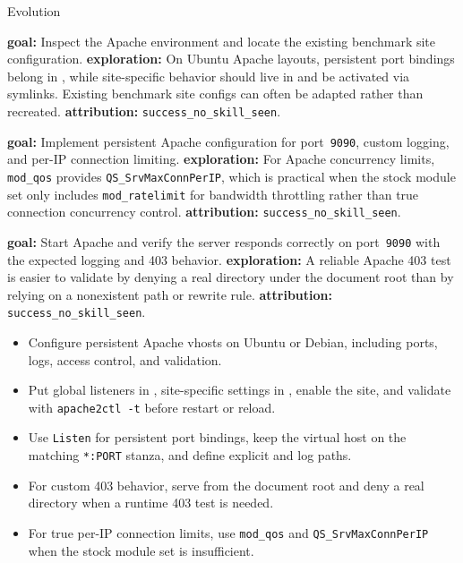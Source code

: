 \begin{svpromptbox}{Evolution}
\svpartsep
{}
\begin{enumerate}[label=\textnormal{[\arabic*]}, leftmargin=*]
    \item \textbf{goal:} Inspect the Apache environment and locate the existing benchmark site configuration. \textbf{exploration:} On Ubuntu Apache layouts, persistent port bindings belong in , while site-specific behavior should live in  and be activated via symlinks. Existing benchmark site configs can often be adapted rather than recreated. \textbf{attribution:} \texttt{success\_no\_skill\_seen}.
    \item \textbf{goal:} Implement persistent Apache configuration for port~\texttt{9090}, custom logging, and per-IP connection limiting. \textbf{exploration:} For Apache concurrency limits, \texttt{mod\_qos} provides \texttt{QS\_SrvMaxConnPerIP}, which is practical when the stock module set only includes \texttt{mod\_ratelimit} for bandwidth throttling rather than true connection concurrency control. \textbf{attribution:} \texttt{success\_no\_skill\_seen}.
    \item \textbf{goal:} Start Apache and verify the server responds correctly on port~\texttt{9090} with the expected logging and 403 behavior. \textbf{exploration:} A reliable Apache 403 test is easier to validate by denying a real directory under the document root than by relying on a nonexistent path or rewrite rule. \textbf{attribution:} \texttt{success\_no\_skill\_seen}.
\end{enumerate}

\svpartsep
{}
\begin{itemize}
    \item Configure persistent Apache vhosts on Ubuntu or Debian, including ports, logs, access control, and validation.
    \item Put global listeners in , site-specific settings in , enable the site, and validate with \texttt{apache2ctl -t} before restart or reload.
    \item Use \texttt{Listen} for persistent port bindings, keep the virtual host on the matching \texttt{*:PORT} stanza, and define explicit  and log paths.
    \item For custom 403 behavior, serve  from the document root and deny a real directory when a runtime 403 test is needed.
    \item For true per-IP connection limits, use \texttt{mod\_qos} and \texttt{QS\_SrvMaxConnPerIP} when the stock module set is insufficient.
\end{itemize}

\end{svpromptbox}

